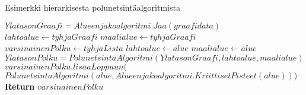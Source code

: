 \begin{algorithm}
\caption{Esimerkki hierarkisesta polunetsintäalgoritmista}\label{HierarkkinenEsim}
\begin{algorithmic}
	\State $YlatasonGraafi = Alueenjakoalgoritmi.Jaa(graafidata)$
	\State $lahtoalue \gets tyhjaGraafi$
	\State $maalialue \gets tyhjaGraafi$
	\State $varsinainenPolku \gets tyhjaLista$
			\State $lahtoalue \gets alue$
		\EndIf
			\State $maalialue \gets alue$
		\EndIf
	\EndFor
	\State $YlatasonPolku = PolunetsintaAlgoritmi(YlatasonGraafi,lahtoalue,maalialue)$
		\State $varsinainenPolku.lisaaLoppuun($
		\State $PolunetsintaAlgoritmi(alue,Alueenjakoalgoritmi.KriittisetPisteet(alue)))$
	\EndFor
	\State \textbf{Return} $varsinainenPolku$
\EndProcedure
\end{algorithmic}
\end{algorithm}
